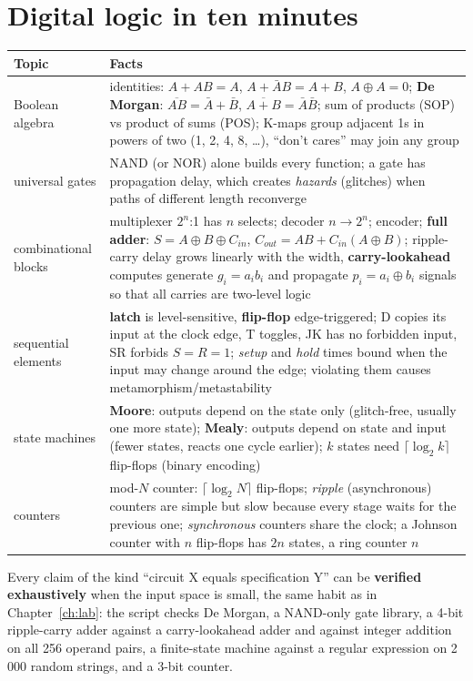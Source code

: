 \documentclass[10pt,a4paper,openany,oneside]{report}
\newcommand{\prio}[1]{\texorpdfstring{\ifcase#1\or{\color{gold}\ding{72}}\or{\color{gold}\ding{72}\ding{72}}\or{\color{gold}\ding{72}\ding{72}\ding{72}}\fi}{}}
\begin{document}
\section{Digital logic in ten minutes \prio{2}}
\begin{center}\small
\begin{xltabular}{\textwidth}{@{}L{3.6cm}Y@{}}
\toprule
\textbf{Topic} & \textbf{Facts}\\
\midrule\endhead
Boolean algebra & identities: $A+AB=A$, $A+\bar AB=A+B$, $A\oplus A=0$; \textbf{De Morgan}: $\overline{AB}=\bar A+\bar B$, $\overline{A+B}=\bar A\bar B$; sum of products (SOP) vs product of sums (POS); K-maps group adjacent 1s in powers of two (1, 2, 4, 8, \ldots), ``don't cares'' may join any group\\
universal gates & NAND (or NOR) alone builds every function; a gate has propagation delay, which creates \emph{hazards} (glitches) when paths of different length reconverge\\
combinational blocks & multiplexer $2^n$:1 has $n$ selects; decoder $n\to2^n$; encoder; \textbf{full adder}: $S=A\oplus B\oplus C_{in}$, $C_{out}=AB+C_{in}(A\oplus B)$; ripple-carry delay grows linearly with the width, \textbf{carry-lookahead} computes generate $g_i=a_ib_i$ and propagate $p_i=a_i\oplus b_i$ signals so that all carries are two-level logic\\
sequential elements & \textbf{latch} is level-sensitive, \textbf{flip-flop} edge-triggered; D copies its input at the clock edge, T toggles, JK has no forbidden input, SR forbids $S=R=1$; \emph{setup} and \emph{hold} times bound when the input may change around the edge; violating them causes metamorphism/metastability\\
state machines & \textbf{Moore}: outputs depend on the state only (glitch-free, usually one more state); \textbf{Mealy}: outputs depend on state and input (fewer states, reacts one cycle earlier); $k$ states need $\lceil\log_2k\rceil$ flip-flops (binary encoding)\\
counters & mod-$N$ counter: $\lceil\log_2N\rceil$ flip-flops; \emph{ripple} (asynchronous) counters are simple but slow because every stage waits for the previous one; \emph{synchronous} counters share the clock; a Johnson counter with $n$ flip-flops has $2n$ states, a ring counter $n$\\
\bottomrule
\end{xltabular}
\end{center}
Every claim of the kind ``circuit X equals specification Y'' can be \textbf{verified exhaustively} when the input space is small, the same habit as in Chapter~\ref{ch:lab}: the script checks De Morgan, a NAND-only gate library, a 4-bit ripple-carry adder against a carry-lookahead adder and against integer addition on all 256 operand pairs, a finite-state machine against a regular expression on 2\,000 random strings, and a 3-bit counter.
\end{document}
